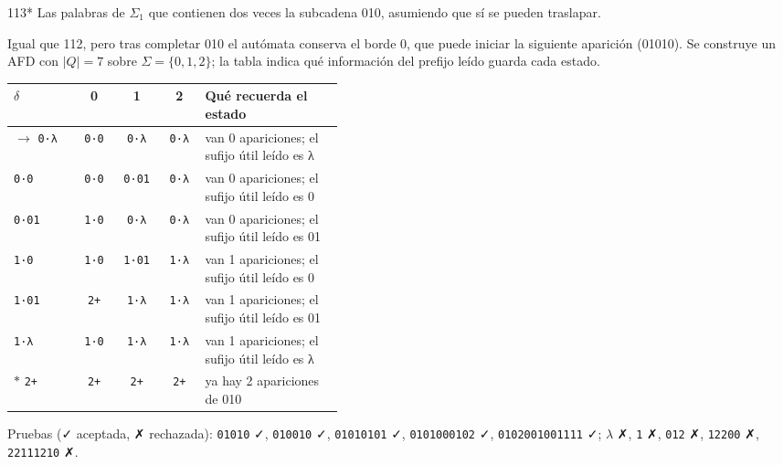 \documentclass[11pt]{article}
\begin{document}
\begin{ejercicio}{113}{*}
Las palabras de $\Sigma_1$ que contienen dos veces la subcadena 010, asumiendo que sí se pueden traslapar.
\end{ejercicio}
\proc Igual que 112, pero tras completar 010 el autómata conserva el borde 0, que puede iniciar la siguiente aparición (01010). Se construye un AFD con $|Q| = 7$ sobre $\Sigma = \{0, 1, 2\}$; la tabla indica qué información del prefijo leído guarda cada estado.
\begin{center}\small\begin{tabular}{lcccp{0.42\linewidth}}\toprule
$\delta$ & 0 & 1 & 2 & Qué recuerda el estado \\\midrule
$\to$ \texttt{0·λ} & \texttt{0·0} & \texttt{0·λ} & \texttt{0·λ} & van 0 apariciones; el sufijo útil leído es λ \\
 \texttt{0·0} & \texttt{0·0} & \texttt{0·01} & \texttt{0·λ} & van 0 apariciones; el sufijo útil leído es 0 \\
 \texttt{0·01} & \texttt{1·0} & \texttt{0·λ} & \texttt{0·λ} & van 0 apariciones; el sufijo útil leído es 01 \\
 \texttt{1·0} & \texttt{1·0} & \texttt{1·01} & \texttt{1·λ} & van 1 apariciones; el sufijo útil leído es 0 \\
 \texttt{1·01} & \texttt{2+} & \texttt{1·λ} & \texttt{1·λ} & van 1 apariciones; el sufijo útil leído es 01 \\
 \texttt{1·λ} & \texttt{1·0} & \texttt{1·λ} & \texttt{1·λ} & van 1 apariciones; el sufijo útil leído es λ \\
$*$ \texttt{2+} & \texttt{2+} & \texttt{2+} & \texttt{2+} & ya hay 2 apariciones de 010 \\
\bottomrule\end{tabular}\end{center}
Pruebas (✓ aceptada, ✗ rechazada): \texttt{01010} ✓, \texttt{010010} ✓, \texttt{01010101} ✓, \texttt{0101000102} ✓, \texttt{0102001001111} ✓; $\lambda$ ✗, \texttt{1} ✗, \texttt{012} ✗, \texttt{12200} ✗, \texttt{22111210} ✗.
\end{document}
